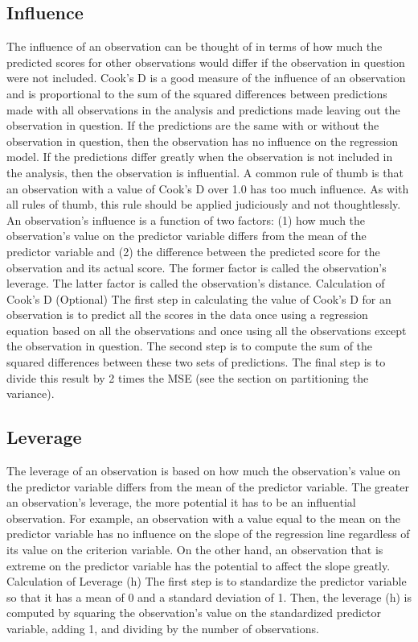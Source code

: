 \subsection*{Influence}
The influence of an observation can be thought of in terms of how much the predicted scores for other observations would differ if the observation in question were not included. Cook's D is a good measure of the influence of an observation and is proportional to the sum of the squared differences between predictions made with all observations in the analysis and predictions made leaving out the observation in question. If the predictions are the same with or without the observation in question, then the observation has no influence on the regression model. If the predictions differ greatly when the observation is not included in the analysis, then the observation is influential.
A common rule of thumb is that an observation with a value of Cook's D over 1.0 has too much influence. As with all rules of thumb, this rule should be applied judiciously and not thoughtlessly.
An observation's influence is a function of two factors: (1) how much the observation's value on the predictor variable differs from the mean of the predictor variable and (2) the difference between the predicted score for the observation and its actual score. The former factor is called the observation's leverage. The latter factor is called the observation's distance.
Calculation of Cook's D (Optional)
The first step in calculating the value of Cook's D for an observation is to predict all the scores in the data once using a regression equation based on all the observations and once using all the observations except the observation in question. The second step is to compute the sum of the squared differences between these two sets of predictions. The final step is to divide this result by 2 times the MSE (see the section on partitioning the variance).
\subsection*{Leverage}
The leverage of an observation is based on how much the observation's value on the predictor variable differs from the mean of the predictor variable. The greater an observation's leverage, the more potential it has to be an influential observation. For example, an observation with a value equal to the mean on the predictor variable has no influence on the slope of the regression line regardless of its value on the criterion variable. On the other hand, an observation that is extreme on the predictor variable has the potential to affect the slope greatly.
Calculation of Leverage (h)
The first step is to standardize the predictor variable so that it has a mean of 0 and a standard deviation of 1. Then, the leverage (h) is computed by squaring the observation's value on the standardized predictor variable, adding 1, and dividing by the number of observations.
